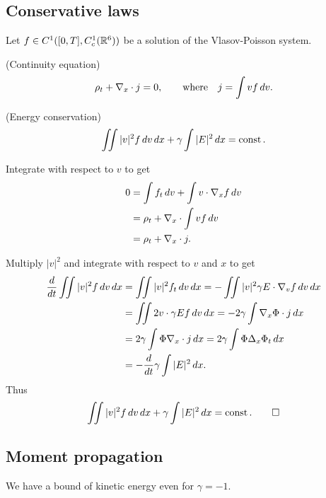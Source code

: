 \documentclass[11pt]{amsart}
\begin{document}
\subsection{Conservative laws}

\begin{lem}
Let $f\in C^1([0,T],C_c^1(\mathbb{R}^6))$ be a solution of the Vlasov-Poisson system.
\begin{cond}
\item(Continuity equation)
\[\rho_t+\nabla_x\cdot j=0,\qquad\text{where}\quad j=\int vf\,dv.\]
\item(Energy conservation)
\[\iint|v|^2f\,dv\,dx+\gamma\int|E|^2\,dx=\operatorname{const}.\]
\end{cond}
\end{lem}
\begin{pfs}
\item
Integrate with respect to $v$ to get
\begin{align*}
0&=\int f_t\,dv+\int v\cdot\nabla_xf\,dv\\
&=\rho_t+\nabla_x\cdot\int vf\,dv\\
&=\rho_t+\nabla_x\cdot j.
\end{align*}
\item
Multiply $|v|^2$ and integrate with respect to $v$ and $x$ to get
\begin{align*}
\dd{t}\iint|v|^2f\,dv\,dx
&=\iint|v|^2f_t\,dv\,dx=-\iint|v|^2\gamma E\cdot\del_vf\,dv\,dx\\
&=\iint2v\cdot\gamma Ef\,dv\,dx=-2\gamma\int\del_x\Phi\cdot j\,dx\\
&=2\gamma\int\Phi\del_x\cdot j\,dx=2\gamma\int\Phi\Delta_x\Phi_t\,dx\\
&=-\dd{t}\gamma\int|E|^2\,dx.
\end{align*}
Thus
\[\iint|v|^2f\,dv\,dx+\gamma\int|E|^2\,dx=\operatorname{const}.\qedhere\]
\end{pfs}



\subsection{Moment propagation}

We have a bound of kinetic energy even for $\gamma=-1$.
\end{document}
